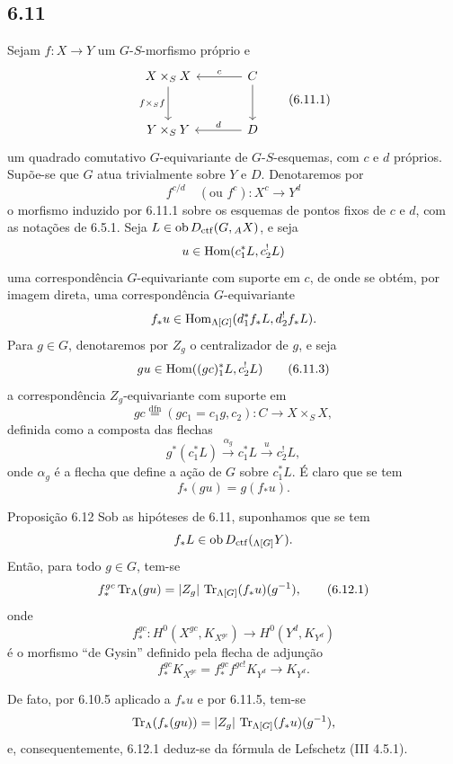 \subsection*{6.11}
Sejam $f:X\to Y$ um $G$-$S$-morfismo próprio e
\begin{equation}
\begin{tikzcd}[column sep=large,row sep=large]
X\times_SX \arrow[d,"f\times_Sf"'] & C \arrow[l,"c"'] \arrow[d]\\
Y\times_SY & D \arrow[l,"d"']
\end{tikzcd}
\tag{6.11.1}
\end{equation}
um quadrado comutativo $G$-equivariante de $G$-$S$-esquemas, com $c$ e $d$ próprios. Supõe-se que $G$ atua trivialmente sobre $Y$ e $D$. Denotaremos por
\begin{equation}
f^{c/d}\quad(\text{ou } f^c):X^c\longrightarrow Y^d
\tag{6.11.2}
\end{equation}
o morfismo induzido por 6.11.1 sobre os esquemas de pontos fixos de $c$ e $d$, com as notações de 6.5.1. Seja $L\in\operatorname{ob} D_{\mathrm{ctf}}(G,{}_AX)$, e seja
\[
u\in\operatorname{Hom}(c_1^*L,c_2^!L)
\]
uma correspondência $G$-equivariante com suporte em $c$, de onde se obtém, por imagem direta, uma correspondência $G$-equivariante
\[
f_*u\in\operatorname{Hom}_{\Lambda[G]}(d_1^*f_*L,d_2^!f_*L).
\]
Para $g\in G$, denotaremos por $Z_g$ o centralizador de $g$, e seja
\begin{equation}
gu\in\operatorname{Hom}((gc)_1^*L,c_2^!L)
\tag{6.11.3}
\end{equation}
a correspondência $Z_g$-equivariante com suporte em
\begin{equation}
gc\stackrel{\mathrm{dfn}}{=}(gc_1=c_1g,c_2):C\to X\times_SX,
\tag{6.11.4}
\end{equation}
definida como a composta das flechas
\[
g^*(c_1^*L)\xrightarrow{\alpha_g}c_1^*L\xrightarrow{u}c_2^!L,
\]
onde $\alpha_g$ é a flecha que define a ação de $G$ sobre $c_1^*L$. É claro que se tem
\begin{equation}
f_*(gu)=g(f_*u).
\tag{6.11.5}
\end{equation}

\begin{statement}{Proposição 6.12}
Sob as hipóteses de 6.11, suponhamos que se tem
\[
f_*L\in\operatorname{ob} D_{\mathrm{ctf}}({}_{\Lambda[G]}Y).
\]
Então, para todo $g\in G$, tem-se
\begin{equation}
f_*^{gc}\operatorname{Tr}_{\Lambda}(gu)
=
|Z_g|\,\operatorname{Tr}_{\Lambda[G]}(f_*u)(g^{-1}),
\tag{6.12.1}
\end{equation}
onde
\[
f_*^{gc}:H^0(X^{gc},K_{X^{gc}})\longrightarrow H^0(Y^d,K_{Y^d})
\]
é o morfismo ``de Gysin'' definido pela flecha de adjunção
\[
f_*^{gc}K_{X^{gc}}=f_*^{gc}f^{gc!}K_{Y^d}\longrightarrow K_{Y^d}.
\]
\end{statement}

De fato, por 6.10.5 aplicado a $f_*u$ e por 6.11.5, tem-se
\[
\operatorname{Tr}_{\Lambda}(f_*(gu))=|Z_g|\,\operatorname{Tr}_{\Lambda[G]}(f_*u)(g^{-1}),
\]
e, consequentemente, 6.12.1 deduz-se da fórmula de Lefschetz (III 4.5.1).

